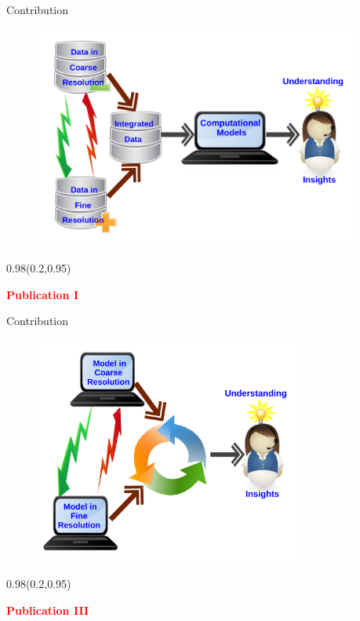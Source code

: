 \documentclass[first=dgreen,second=purple,logo=redexc]{aaltoslides}
\newcommand\FrameText[1]{%
  \begin{textblock*}{0.98\textwidth}(0.2\textwidth,0.95\textheight)
    \textcolor {red}{\scriptsize\raggedright #1\hspace{0.1\textwidth}}
  \end{textblock*}}
\begin{document}

 \begin{frame}{Contribution}
 \begin{figure}
 \centering
   \includegraphics[trim=0cm 0cm 0cm 0cm, clip=true,width=0.95\textwidth]{figures/dataint}
 \end{figure}
 \FrameText{\textbf{Publication I}}
 \end{frame}
 

 \begin{frame}{Contribution}
 \begin{figure}
 \centering
   \includegraphics[trim=0cm 0cm 0cm 0cm, clip=true,width=0.78\textwidth]{figures/modelint}
 \end{figure}
 \FrameText{\textbf{Publication III}}
 \end{frame}
 
\end{document}
